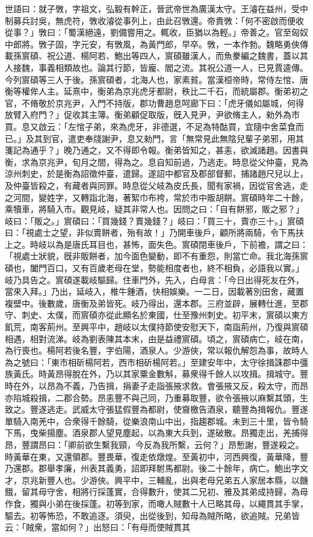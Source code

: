 \begin{pinyinscope}
世語曰：就子斆，字祖文，弘毅有幹正，晉武帝世為廣漢太守。王濬在益州，受中制募兵討吳，無虎符，斆收濬從事列上，由此召斆還。帝責斆：「何不密啟而便收從事？」斆曰：「蜀漢絕遠，劉備嘗用之。輒收，臣猶以為輕。」帝善之。官至匈奴中郎將。斆子固，字元安，有斆風，為黃門郎，早卒。斆，一本作勃。魏略勇俠傳載孫賔碩、祝公道、楊阿若、鮑出等四人，賔碩雖漢人，而魚豢編之魏書，蓋以其人接魏，事義相類故也。論其行節，皆龐、閻之流。其祝公道一人，已見賈逵傳。今列賔碩等三人于後。孫賔碩者，北海人也，家素貧。當漢桓帝時，常侍左悺、唐衡等權侔人主。延熹中，衡弟為京兆虎牙都尉，秩比二千石，而統屬郡。衡弟初之官，不脩敬於京兆尹，入門不持版，郡功曹趙息呵廊下曰：「虎牙儀如屬城，何得放臂入府門？」促收其主簿。衡弟顧促取版，旣入見尹，尹欲脩主人，勑外為市買。息又啟云：「左悺子弟，來為虎牙，非德選，不足為特酤買，宜隨中舍菜食而已。」及其到官，遣吏奉牋謝尹，息又勑門，言「無常見此無陰兒輩子弟邪，用其箋記為通乎？」晚乃通之，又不得即令報。衡弟皆知之，甚恚，欲滅諸趙。因書與衡，求為京兆尹，旬月之間，得為之。息自知前過，乃逃走。時息從父仲臺，見為涼州刺史，於是衡為詔徵仲臺，遣歸。遂詔中都官及郡部督郵，捕諸趙尺兒以上，及仲臺皆殺之，有藏者與同罪。時息從父岐為皮氏長，聞有家禍，因從官舍逃，走之河間，變姓字，又轉詣北海，著絮巾布袴，常於市中販胡餅。賔碩時年二十餘，乘犢車，將騎入市。觀見岐，疑其非常人也。因問之曰：「自有餅邪，販之邪？」岐曰：「販之。」賔碩曰：「買幾錢？賣幾錢？」岐曰：「買三十，賣亦三十。」賔碩曰：「視處士之望，非似賣餅者，殆有故！」乃開車後戶，顧所將兩騎，令下馬扶上之。時岐以為是唐氏耳目也，甚怖，面失色。賔碩閉車後戶，下前襜，謂之曰：「視處士狀貌，旣非販餅者，加今面色變動，即不有重怨，則當亡命。我北海孫賔碩也，闔門百口，又有百歲老母在堂，勢能相度者也，終不相負，必語我以實。」岐乃具告之。賔碩遂載岐驅歸。住車門外，先入，白母言：「今日出得死友在外，當來入拜。」乃出，延岐入，椎牛鍾酒，快相娛樂。一二日，因載著別田舍，藏置複壁中。後數歲，唐衡及弟皆死。岐乃得出，還本郡。三府並辟，展轉仕進，至郡守、刺史、太僕，而賔碩亦從此顯名於東國，仕至豫州刺史。初平末，賔碩以東方飢荒，南客荊州。至興平中，趙岐以太僕持節使安慰天下，南詣荊州，乃復與賔碩相遇，相對流涕。岐為劉表陳其本末，由是益禮賔碩。頃之，賔碩病亡，岐在南，為行喪也。楊阿若後名豐，字伯陽，酒泉人。少游俠，常以報仇解怨為事，故時人為之號曰：「東市相斫楊阿若，西市相斫楊阿若。」至建安年中，太守徐揖誅郡中彊族黃氏。時黃昂得脫在外，乃以其家粟金數斛，募衆得千餘人以攻揖。揖城守。豐時在外，以昂為不義，乃告揖，捐妻子走詣張掖求救。會張掖又反，殺太守，而昂亦陷城殺揖，二郡合勢。昂恚豐不與己同，乃重募取豐，欲令張掖以麻繫其頭，生致之。豐遂逃走。武威太守張猛假豐為都尉，使齎檄告酒泉，聽豐為揖報仇。豐遂單騎入南羌中，合衆得千餘騎，從樂浪南山中出，指趨郡城。未到三十里，皆令騎下馬，曳柴揚塵。酒泉郡人望見塵起，以為東大兵到，遂破散。昂獨走出，羌捕得昂，豐謂昂曰：「卿前欲生繫我頸，今反為我所繫，云何？」昂慙謝，豐遂殺之。時黃華在東，又還領郡。豐畏華，復走依燉煌。至黃初中，河西興復，黃華降，豐乃還郡。郡舉孝廉，州表其義勇，詔即拜駙馬都尉。後二十餘年，病亡。鮑出字文才，京兆新豐人也。少游俠。興平中，三輔亂，出與老母兄弟五人家居本縣，以饑餓，留其母守舍，相將行採蓬實，合得數升，使其二兄初、雅及其弟成持歸，為母作食，獨與小弟在後採蓬。初等到家，而噉人賊數十人已略其母，以繩貫其手掌，驅去。初等怖恐，不敢追逐。須臾，出從後到，知母為賊所略，欲追賊。兄弟皆云：「賊衆，當如何？」出怒曰：「有母而使賊貫其
\end{pinyinscope}

